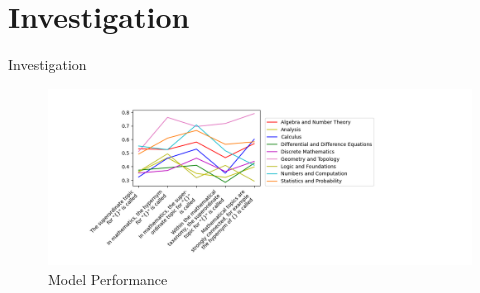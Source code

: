 \documentclass{beamer}
\begin{document}
\section{Investigation}
\begin{frame}{Investigation}
	\begin{figure}[hbtp]
		\centering
		\includegraphics[width=1.3\linewidth]{./images/Model.png}
		\caption{Model Performance}
		\label{fig:model}
	\end{figure}
\end{frame}
\end{document}
